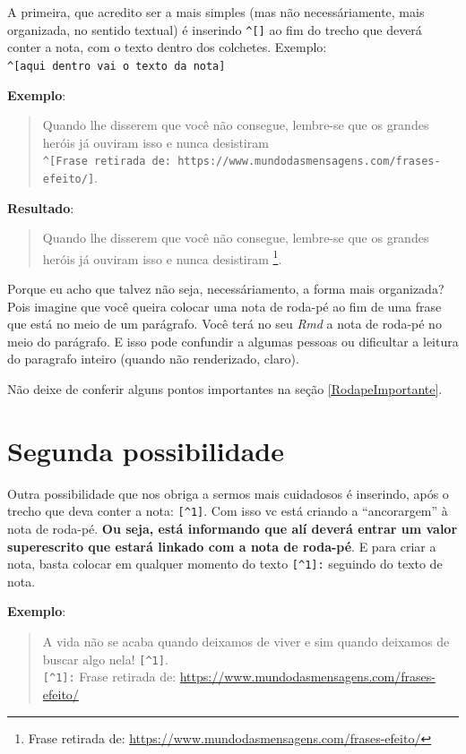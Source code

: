 \documentclass[]{book}
\begin{document}
A primeira, que acredito ser a mais simples (mas não necessáriamente, mais organizada, no sentido textual) é inserindo \texttt{\^{}{[}{]}} ao fim do trecho que deverá conter a nota, com o texto dentro dos colchetes. Exemplo:
\texttt{\^{}{[}aqui\ dentro\ vai\ o\ texto\ da\ nota{]}}

\textbf{Exemplo}:

\begin{quote}
Quando lhe disserem que você não consegue, lembre-se que os grandes heróis já ouviram isso e nunca desistiram \texttt{\^{}{[}Frase\ retirada\ de:\ https://www.mundodasmensagens.com/frases-efeito/{]}}.
\end{quote}

\textbf{Resultado}:

\begin{quote}
Quando lhe disserem que você não consegue, lembre-se que os grandes heróis já ouviram isso e nunca desistiram \footnote{Frase retirada de: \url{https://www.mundodasmensagens.com/frases-efeito/}}.
\end{quote}

Porque eu acho que talvez não seja, necessáriamento, a forma mais organizada? Pois imagine que você queira colocar uma nota de roda-pé ao fim de uma frase que está no meio de um parágrafo. Você terá no seu \emph{Rmd} a nota de roda-pé no meio do parágrafo. E isso pode confundir a algumas pessoas ou dificultar a leitura do paragrafo inteiro (quando não renderizado, claro).

Não deixe de conferir alguns pontos importantes na seção \ref{RodapeImportante}.

\hypertarget{op2}{%
\section{Segunda possibilidade}\label{op2}}

Outra possibilidade que nos obriga a sermos mais cuidadosos é inserindo, após o trecho que deva conter a nota: \texttt{{[}\^{}1{]}}. Com isso vc está criando a ``ancorargem'' à nota de roda-pé. \textbf{Ou seja, está informando que alí deverá entrar um valor superescrito que estará linkado com a nota de roda-pé}. E para criar a nota, basta colocar em qualquer momento do texto \texttt{{[}\^{}1{]}:} seguindo do texto de nota.

\textbf{Exemplo}:

\begin{quote}
A vida não se acaba quando deixamos de viver e sim quando deixamos de buscar algo nela! \texttt{{[}\^{}1{]}}.\\
\texttt{{[}\^{}1{]}:} Frase retirada de: \url{https://www.mundodasmensagens.com/frases-efeito/}
\end{quote}
\end{document}
